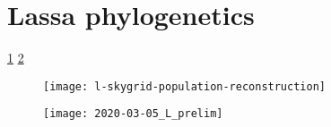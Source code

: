 \section{Lassa phylogenetics}

\ref{fig:l-skygrid}
\ref{fig:L-prelim}

\begin{figure}[ht]
  \centering
  \medskip
  \texttt{[image: l-skygrid-population-reconstruction]}
  \caption[Demographic history of Lassa's L segment]{}
  \label{fig:l-skygrid}
\end{figure}

\begin{figure}[ht]
  \centering
  \medskip
  \texttt{[image: 2020-03-05\_L\_prelim]}
  \caption[Sample output of online analysis framework]{}
  \label{fig:L-prelim}
\end{figure}



\cleardoublepage

